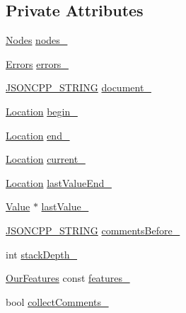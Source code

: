\subsection*{Private Attributes}
\begin{DoxyCompactItemize}
\item 
\hyperlink{classJson_1_1OurReader_a8480a5ef159cee3a090f96358414d8d3}{Nodes} \hyperlink{classJson_1_1OurReader_a19cc4e8c5d17ee6822f752e9a36f4ce3}{nodes\+\_\+}
\item 
\hyperlink{classJson_1_1OurReader_a8cc69593ef7303e58e99bb5dbb767562}{Errors} \hyperlink{classJson_1_1OurReader_afb76b68ba1ab68fe09cf2838e3d4898d}{errors\+\_\+}
\item 
\hyperlink{json_8hpp_a1e723f95759de062585bc4a8fd3fa4be}{J\+S\+O\+N\+C\+P\+P\+\_\+\+S\+T\+R\+I\+NG} \hyperlink{classJson_1_1OurReader_a726230af83d22d25e0c76cec3408ecf1}{document\+\_\+}
\item 
\hyperlink{classJson_1_1OurReader_a1bdc7bbc52ba87cae6b19746f2ee0189}{Location} \hyperlink{classJson_1_1OurReader_a9bda9d72335d52cd06e65f9eca3f70f5}{begin\+\_\+}
\item 
\hyperlink{classJson_1_1OurReader_a1bdc7bbc52ba87cae6b19746f2ee0189}{Location} \hyperlink{classJson_1_1OurReader_ab1f69b0260c27a0d2d65dc56e42c8f9d}{end\+\_\+}
\item 
\hyperlink{classJson_1_1OurReader_a1bdc7bbc52ba87cae6b19746f2ee0189}{Location} \hyperlink{classJson_1_1OurReader_a5211fbbba94be80a22dd2317c621efcc}{current\+\_\+}
\item 
\hyperlink{classJson_1_1OurReader_a1bdc7bbc52ba87cae6b19746f2ee0189}{Location} \hyperlink{classJson_1_1OurReader_a101eadc45e01c60628b53f0db3d13482}{last\+Value\+End\+\_\+}
\item 
\hyperlink{classJson_1_1Value}{Value} $\ast$ \hyperlink{classJson_1_1OurReader_a9f994b6a2227c5d96e6ed6cbc74ed251}{last\+Value\+\_\+}
\item 
\hyperlink{json_8hpp_a1e723f95759de062585bc4a8fd3fa4be}{J\+S\+O\+N\+C\+P\+P\+\_\+\+S\+T\+R\+I\+NG} \hyperlink{classJson_1_1OurReader_a9c53e77e290eb9081298210a955fda6a}{comments\+Before\+\_\+}
\item 
int \hyperlink{classJson_1_1OurReader_aaa91c93bc064c7086248ea01eddcf51a}{stack\+Depth\+\_\+}
\item 
\hyperlink{classJson_1_1OurFeatures}{Our\+Features} const \hyperlink{classJson_1_1OurReader_a2714302d5cc54ca2ce4118ea51c0397a}{features\+\_\+}
\item 
bool \hyperlink{classJson_1_1OurReader_a259f6ac988da2894bcafc670e42f73ad}{collect\+Comments\+\_\+}
\end{DoxyCompactItemize}


